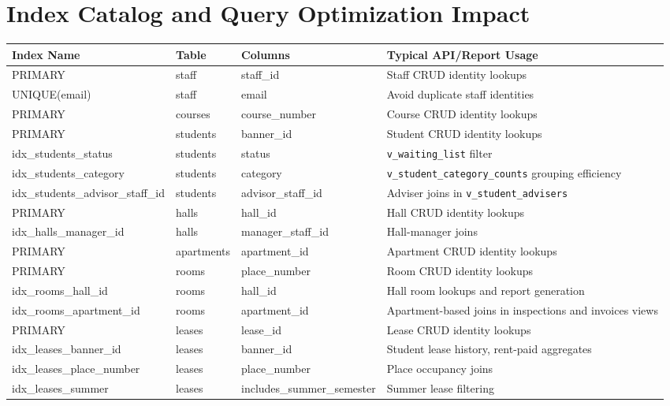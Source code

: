 \documentclass[11pt,a4paper]{article}
\begin{document}
\section{Index Catalog and Query Optimization Impact}
\begin{longtable}{>{\raggedright\arraybackslash}p{} >{\raggedright\arraybackslash}p{} >{\raggedright\arraybackslash}p{} >{\raggedright\arraybackslash}p{}}
\toprule
\textbf{Index Name} & \textbf{Table} & \textbf{Columns} & \textbf{Typical API/Report Usage} \\
\midrule
\endhead
PRIMARY & staff & staff\_id & Staff CRUD identity lookups \\
UNIQUE(email) & staff & email & Avoid duplicate staff identities \\
PRIMARY & courses & course\_number & Course CRUD identity lookups \\
PRIMARY & students & banner\_id & Student CRUD identity lookups \\
idx\_students\_status & students & status & \texttt{v\_waiting\_list} filter \\
idx\_students\_category & students & category & \texttt{v\_student\_category\_counts} grouping efficiency \\
idx\_students\_advisor\_staff\_id & students & advisor\_staff\_id & Adviser joins in \texttt{v\_student\_advisers} \\
PRIMARY & halls & hall\_id & Hall CRUD identity lookups \\
idx\_halls\_manager\_id & halls & manager\_staff\_id & Hall-manager joins \\
PRIMARY & apartments & apartment\_id & Apartment CRUD identity lookups \\
PRIMARY & rooms & place\_number & Room CRUD identity lookups \\
idx\_rooms\_hall\_id & rooms & hall\_id & Hall room lookups and report generation \\
idx\_rooms\_apartment\_id & rooms & apartment\_id & Apartment-based joins in inspections and invoices views \\
PRIMARY & leases & lease\_id & Lease CRUD identity lookups \\
idx\_leases\_banner\_id & leases & banner\_id & Student lease history, rent-paid aggregates \\
idx\_leases\_place\_number & leases & place\_number & Place occupancy joins \\
idx\_leases\_summer & leases & includes\_summer\_semester & Summer lease filtering \\

\end{longtable}
\end{document}
